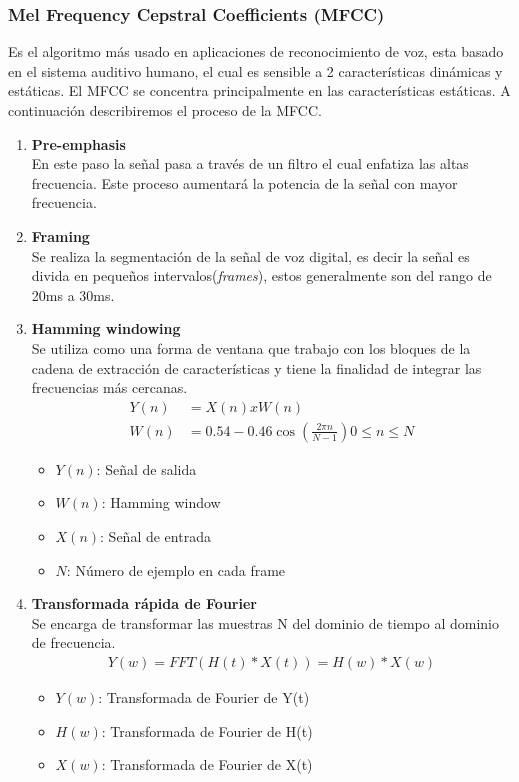 \subsubsection{Mel Frequency Cepstral Coefficients (MFCC)} 
Es el algoritmo más usado en aplicaciones de reconocimiento de voz, esta basado en el sistema auditivo humano, el cual es sensible a 2 características dinámicas y estáticas. El MFCC se concentra principalmente en las características estáticas. A continuación describiremos el proceso de la MFCC.
\begin{enumerate}
	\item \textbf{Pre-emphasis\\}
	En este paso la señal pasa a través de un filtro el cual enfatiza las altas frecuencia. Este proceso aumentará la potencia de la señal con mayor frecuencia.
	\item \textbf{Framing\\}
	Se realiza la segmentación de la señal de voz digital, es decir la señal es divida en pequeños intervalos(\textit{frames}), estos generalmente son del rango de 20ms a 30ms.

	\item \textbf{Hamming windowing\\}
	Se utiliza como una forma de ventana que trabajo con los bloques de la cadena de extracción de características y tiene la finalidad de integrar las frecuencias más cercanas.
	\begin{equation}
	\label{STs3}
	\begin{aligned}
	Y(n)&= X(n) x W(n)\\
	W(n)&=0.54-0.46\cos(\frac{2\pi n}{N-1})    0\leq n\leq N
	\end{aligned}
	\end{equation}
	\begin{itemize}
		\item $Y(n)$: Señal de salida
		\item $W(n)$: Hamming window
		\item $X(n)$: Señal de entrada
		\item $N$: Número de ejemplo en cada frame
	\end{itemize}
	\item \textbf{Transformada rápida de Fourier\\} 
	Se encarga de transformar las muestras N del dominio de tiempo al dominio de frecuencia.
	\begin{equation}
		\label{TFF}
		\begin{aligned}
		Y(w)= FFT(H(t)\ast X(t))= H(w) \ast X(w)
		\end{aligned}
	\end{equation}
		\begin{itemize}
			\item $Y(w)$: Transformada de Fourier de Y(t)
			\item $H(w)$: Transformada de Fourier de H(t)
			\item $X(w)$: Transformada de Fourier de X(t)


\end{itemize}
\end{enumerate}
